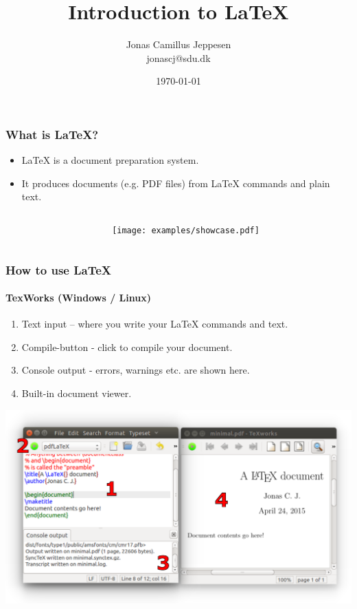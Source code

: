\documentclass[]{beamer}
\title[{\LaTeX}]{Introduction to {\LaTeX}}
\author[Jonas C. J.]{Jonas Camillus Jeppesen\\jonascj@sdu.dk}
\institute[SDU] %
{
  Center for Biomembrane Physics (Memphys), FKF, SDU
}
\date[\today]{\today}
\begin{document}
\begin{frame}
\titlepage
\end{frame}


\begin{frame}[fragile]
\frametitle{What is \LaTeX{}?}
\begin{itemize}
\item \LaTeX{} is a document preparation system.
\item It produces documents (e.g. PDF files) from \LaTeX{} commands and plain text.
\end{itemize}

\begin{columns}
    \begin{column}{.48\textwidth} 
	\end{column}%
	\begin{column}{.48\textwidth}
		\texttt{[image: examples/showcase.pdf]}
	\end{column}
\end{columns}

\end{frame}



\begin{frame}[fragile]
\frametitle{How to use \LaTeX{}}
\framesubtitle{TexWorks (Windows / Linux)}
\begin{enumerate}
	\item<+-> Text input -- where you write your \LaTeX{} commands and text.
	\item<+-> Compile-button - click to compile your document.
	\item<+-> Console output - errors, warnings etc. are shown here.
	\item<+-> Built-in document viewer.
\end{enumerate}

\includegraphics[width=\textwidth]{figs/texworks.pdf}
\end{frame}
\end{document}
